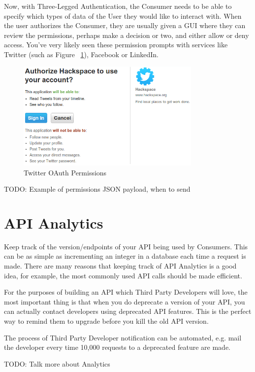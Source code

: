 \documentclass{book}
\begin{document}
Now, with Three-Legged Authentication, the Consumer needs to be able to specify which types of data of the User they would like to interact with. When the user authorizes the Consumer, they are usually given a GUI where they can review the permissions, perhaps make a decision or two, and either allow or deny access. You've very likely seen these permission prompts with services like Twitter (such as Figure ~\ref{fig:twitteroauth}), Facebook or LinkedIn.

\begin{figure}[ht!]
\centering
\includegraphics[width=90mm]{images/permissions-twitter.png}
\caption{Twitter OAuth Permissions}
\label{fig:twitteroauth}
\end{figure}

TODO: Example of permissions JSON payload, when to send


\section{API Analytics}

Keep track of the version/endpoints of your API being used by Consumers. This can be as simple as incrementing an integer in a database each time a request is made. There are many reasons that keeping track of API Analytics is a good idea, for example, the most commonly used API calls should be made efficient.

For the purposes of building an API which Third Party Developers will love, the most important thing is that when you do deprecate a version of your API, you can actually contact developers using deprecated API features. This is the perfect way to remind them to upgrade before you kill the old API version.

The process of Third Party Developer notification can be automated, e.g. mail the developer every time 10,000 requests to a deprecated feature are made.

TODO: Talk more about Analytics
\end{document}
